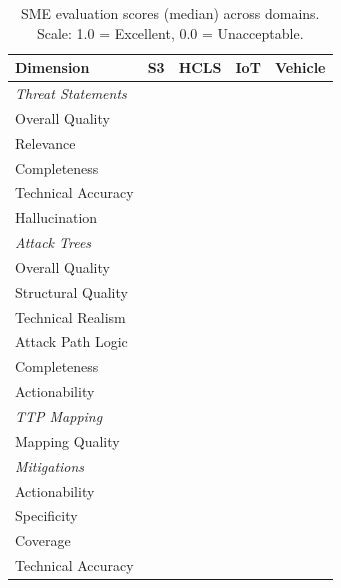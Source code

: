 \begin{table}[t]
\centering
\caption{SME evaluation scores (median) across domains. Scale: 1.0 = Excellent, 0.0 = Unacceptable.}
\label{tab:sme-scores}
\begin{tabular}{lrrrr}
\toprule
\textbf{Dimension} & \textbf{S3} & \textbf{HCLS} & \textbf{IoT} & \textbf{Vehicle} \\
\midrule
\multicolumn{5}{l}{\emph{Threat Statements}} \\
\quad Overall Quality & \todo{} & \todo{} & \todo{} & \todo{} \\
\quad Relevance & \todo{} & \todo{} & \todo{} & \todo{} \\
\quad Completeness & \todo{} & \todo{} & \todo{} & \todo{} \\
\quad Technical Accuracy & \todo{} & \todo{} & \todo{} & \todo{} \\
\quad Hallucination & \todo{} & \todo{} & \todo{} & \todo{} \\
\midrule
\multicolumn{5}{l}{\emph{Attack Trees}} \\
\quad Overall Quality & \todo{} & \todo{} & \todo{} & \todo{} \\
\quad Structural Quality & \todo{} & \todo{} & \todo{} & \todo{} \\
\quad Technical Realism & \todo{} & \todo{} & \todo{} & \todo{} \\
\quad Attack Path Logic & \todo{} & \todo{} & \todo{} & \todo{} \\
\quad Completeness & \todo{} & \todo{} & \todo{} & \todo{} \\
\quad Actionability & \todo{} & \todo{} & \todo{} & \todo{} \\
\midrule
\multicolumn{5}{l}{\emph{TTP Mapping}} \\
\quad Mapping Quality & \todo{} & \todo{} & \todo{} & \todo{} \\
\midrule
\multicolumn{5}{l}{\emph{Mitigations}} \\
\quad Actionability & \todo{} & \todo{} & \todo{} & \todo{} \\
\quad Specificity & \todo{} & \todo{} & \todo{} & \todo{} \\
\quad Coverage & \todo{} & \todo{} & \todo{} & \todo{} \\
\quad Technical Accuracy & \todo{} & \todo{} & \todo{} & \todo{} \\
\bottomrule
\end{tabular}
\end{table}
